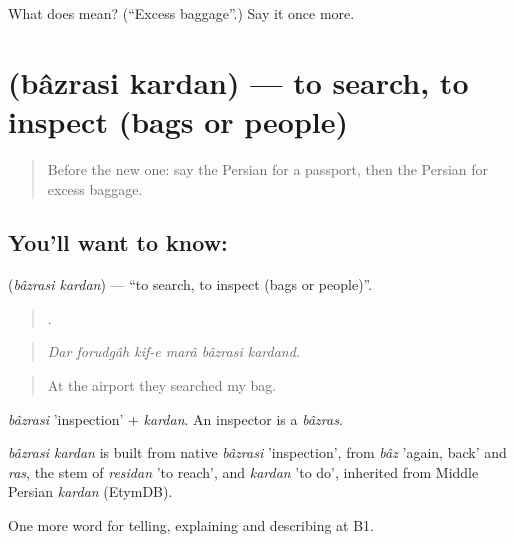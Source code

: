 \begin{tcolorbox}[breakable,colback=teal!4,colframe=teal!35!black,title={Before you move on}]
What does   mean? (\textquotedblleft{}Excess baggage\textquotedblright{}.) Say it once more.
\end{tcolorbox}
\section[\texorpdfstring{\fa{بازرسی} \fa{کردن} (bâzrasi kardan)}{بازرسی کردن (bâzrasi kardan)}]{  (bâzrasi kardan) — to search, to inspect (bags or people)}

\label{lesson:FA-C432-bazrasi-kardan}



\begin{quote}
Before the new one: say the Persian for a passport, then the Persian for excess baggage.
\end{quote}

\subsection*{You'll want to know:  }
\textbf{ } (\emph{bâzrasi kardan}) — \textquotedblleft{}to search, to inspect (bags or people)\textquotedblright{}.

\begin{quote}
     .
\end{quote}

\begin{quote}
\emph{Dar forudgâh kif-e marâ bâzrasi kardand.}
\end{quote}

\begin{quote}
At the airport they searched my bag.
\end{quote}

\emph{bâzrasi} 'inspection' + \emph{kardan}. An inspector is a \emph{bâzras}.

\begin{cousinweb}
\emph{bâzrasi kardan} is built from native \emph{bâzrasi} 'inspection', from \emph{bâz} 'again, back' and \emph{ras}, the stem of \emph{residan} 'to reach', and \emph{kardan} 'to do', inherited from Middle Persian \emph{kardan} (EtymDB).
\end{cousinweb}

\begin{grammarlens}[title={What you've built}]
One more word for telling, explaining and describing at B1.
\end{grammarlens}

